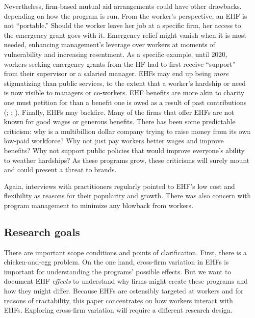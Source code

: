 \documentclass[
  11pt,
  oneside]{article}
\begin{document}
Nevertheless, firm-based mutual aid arrangements could have other drawbacks, depending on how the program is run. From the worker's perspective, an EHF is not ``portable.'' Should the worker leave her job at a specific firm, her access to the emergency grant goes with it. Emergency relief might vanish when it is most needed, enhancing management's leverage over workers at moments of vulnerability and increasing resentment. As a specific example, until 2020, workers seeking emergency grants from the HF had to first receive ``support'' from their supervisor or a salaried manager. EHFs may end up being \emph{more} stigmatizing than public services, to the extent that a worker's hardship or need is now visible to managers or co-workers. EHF benefits are more akin to charity one must petition for than a benefit one is owed as a result of past contributions (; ; ). Finally, EHFs may backfire. Many of the firms that offer EHFs are not known for good wages or generous benefits. There has been some predictable criticism: why is a multibillion dollar company trying to raise money from its own low-paid workforce? Why not just pay workers better wages and improve benefits? Why not support public policies that would improve everyone's ability to weather hardships? As these programs grow, these criticisms will surely mount and could present a threat to brands.

Again, interviews with practitioners regularly pointed to EHF's low cost and flexibility as reasons for their popularity and growth. There was also concern with program management to minimize any blowback from workers.

\subsection{Research goals}\label{research-goals}

There are important scope conditions and points of clarification. First, there is a chicken-and-egg problem. On the one hand, cross-firm variation in EHFs is important for understanding the programs' possible effects. But we want to document EHF \emph{effects} to understand why firms might create these programs and how they might differ. Because EHFs are ostensibly targeted at workers and for reasons of tractability, this paper concentrates on how workers interact with EHFs. Exploring cross-firm variation will require a different research design.
\end{document}
